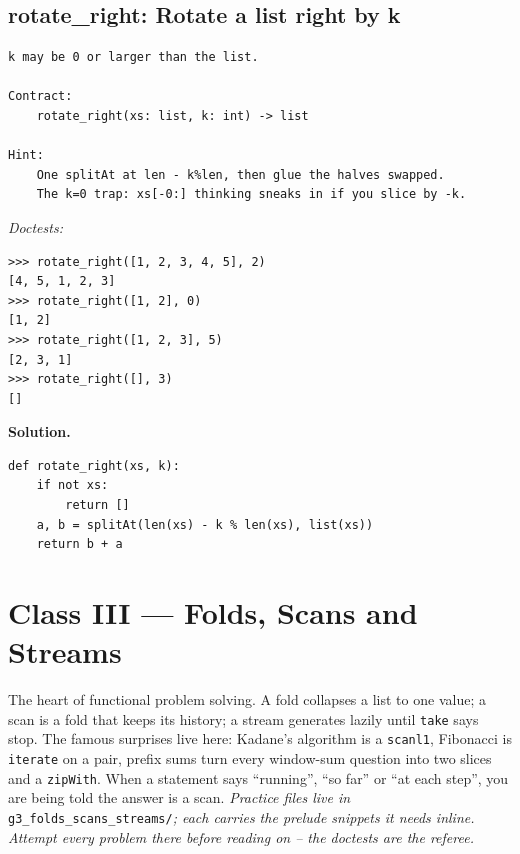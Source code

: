 \documentclass[11pt,letterpaper]{book}
\begin{document}
\section{rotate\_right: Rotate a list right by k}
\begin{lstlisting}[style=spec]
k may be 0 or larger than the list.

Contract:
    rotate_right(xs: list, k: int) -> list

Hint:
    One splitAt at len - k%len, then glue the halves swapped.
    The k=0 trap: xs[-0:] thinking sneaks in if you slice by -k.
\end{lstlisting}
\noindent\textit{Doctests:}
\begin{lstlisting}[style=spec]
>>> rotate_right([1, 2, 3, 4, 5], 2)
[4, 5, 1, 2, 3]
>>> rotate_right([1, 2], 0)
[1, 2]
>>> rotate_right([1, 2, 3], 5)
[2, 3, 1]
>>> rotate_right([], 3)
[]
\end{lstlisting}
\noindent\textbf{Solution.}
\begin{lstlisting}[style=code]
def rotate_right(xs, k):
    if not xs:
        return []
    a, b = splitAt(len(xs) - k % len(xs), list(xs))
    return b + a
\end{lstlisting}
\chapter{Class III --- Folds, Scans and Streams}

The heart of functional problem solving. A fold collapses a list to one value;
a scan is a fold that keeps its history; a stream generates lazily until
\texttt{take} says stop. The famous surprises live here: Kadane's algorithm is
a \texttt{scanl1}, Fibonacci is \texttt{iterate} on a pair, prefix sums turn
every window-sum question into two slices and a \texttt{zipWith}. When a
statement says ``running'', ``so far'' or ``at each step'', you are being told
the answer is a scan.
\medskip\noindent\textit{Practice files live in }\texttt{g3\_folds\_scans\_streams/}\textit{;
each carries the prelude snippets it needs inline. Attempt every problem there
before reading on -- the doctests are the referee.}
\end{document}
